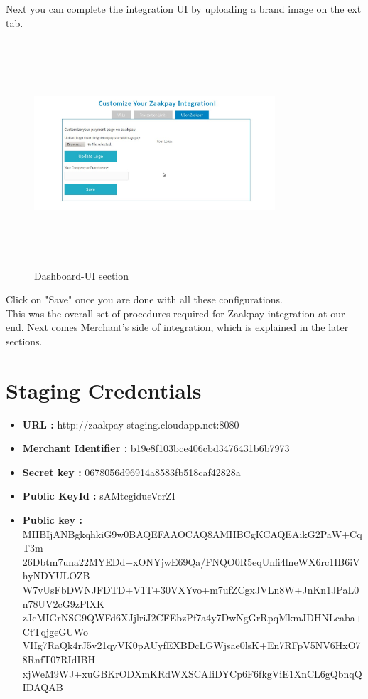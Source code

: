 \documentclass{article}
\begin{document}
Next you can complete the integration UI by uploading a brand image on the ext tab.

\begin{figure}[H]
\centering
\caption{Dashboard-UI section}
\includegraphics[width=0.8\textwidth,height=3.3in]{Zaakpay_ui.png}
\end{figure}
Click on "Save" once you are done with all these configurations.
\\

This was the overall set of procedures required for Zaakpay integration at our end. Next comes Merchant's side of integration, which is explained in the later sections.


\newpage
\section{Staging Credentials}
\begin{itemize}
\item {\bfseries URL : } http://zaakpay-staging.cloudapp.net:8080
\item {\bfseries Merchant Identifier :} b19e8f103bce406cbd3476431b6b7973
\item {\bfseries Secret key :} 0678056d96914a8583fb518caf42828a
\item {\bfseries Public KeyId :}
sAMtcgidueVcrZI
\item {\bfseries Public key :} MIIBIjANBgkqhkiG9w0BAQEFAAOCAQ8AMIIBCgKCAQEAikG2PaW+CqT3m\\26Dbtm7una22MYEDd+xONYjwE69Qa/FNQO0R5eqUnfi4lneWX6rc1IB6iVhyNDYULOZB\\W7vUsFbDWNJFDTD+V1T+30VXYvo+m7ufZCgxJVLn8W+JnKn1JPaL0n78UV2cG9zPlXK\\zJcMIGrNSG9QWFd6XJjlriJ2CFEbzPf7a4y7DwNgGrRpqMkmJDHNLcaba+CtTqjgeGUWo\\VIIg7RaQk4rJ5v21qyVK0pAUyfEXBDcLGWjsae0lsK+En7RFpV5NV6HxO78RnfT07RIdIBH\\xjWeM9WJ+xuGBKrODXmKRdWXSCAIiDYCp6F6fkgViE1XnCL6gQbnqQIDAQAB
\end{itemize}
\newpage
\end{document}
